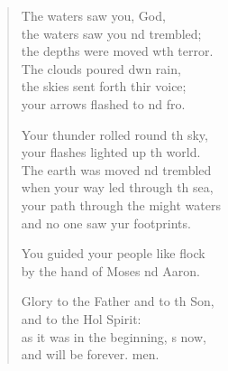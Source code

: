 \begin{verse}
\begin{patverse}
The waters saw you,  God,\Med\\
the waters saw you nd trembled;\\
the depths were moved w\pointup{\i}th terror.\Med\\
The clouds poured dwn rain,\\
the skies sent forth thir voice;\Med\\
your arrows flashed to nd fro.

Your thunder rolled round th sky,\Med\\
your flashes lighted up th world.\\
The earth was moved nd trembled\Med\\
when your way led through th sea,\\
your path through the might waters\Med\\
and no one saw yur footprints.

You guided your people like  flock\Med\\
by the hand of Moses nd Aaron.

Glory to the Father and to th Son,\Med\\
and to the Hol Spirit:\\
as it was in the beginning, \pointup{\i}s now,\Med\\
and will be forever. men.
  \end{patverse}
\end{verse}
